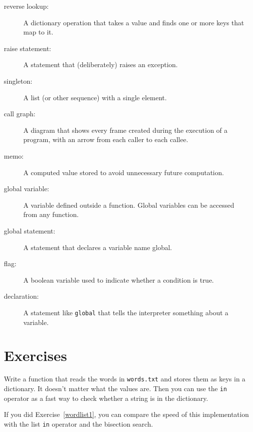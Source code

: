 \documentclass[10pt]{book}
\begin{document}
\begin{description}
\item[reverse lookup:] A dictionary operation that takes a value and finds
one or more keys that map to it.

\item[raise statement:]  A statement that (deliberately) raises an exception.

\item[singleton:] A list (or other sequence) with a single element.

\item[call graph:] A diagram that shows every frame created during
the execution of a program, with an arrow from each caller to
each callee. 

\item[memo:] A computed value stored to avoid unnecessary future 
computation.

\item[global variable:]  A variable defined outside a function.  Global
variables can be accessed from any function.

\item[global statement:]  A statement that declares a variable name
global.

\item[flag:] A boolean variable used to indicate whether a condition
is true.

\item[declaration:] A statement like {\tt global} that tells the
interpreter something about a variable.

\end{description}


\section{Exercises}

\begin{exercise}
\label{wordlist2}

Write a function that reads the words in {\tt words.txt} and
stores them as keys in a dictionary.  It doesn't matter what the
values are.  Then you can use the {\tt in} operator
as a fast way to check whether a string is in
the dictionary.

If you did Exercise~\ref{wordlist1}, you can compare the speed
of this implementation with the list {\tt in} operator and the
bisection search.

\end{exercise}
\end{document}
